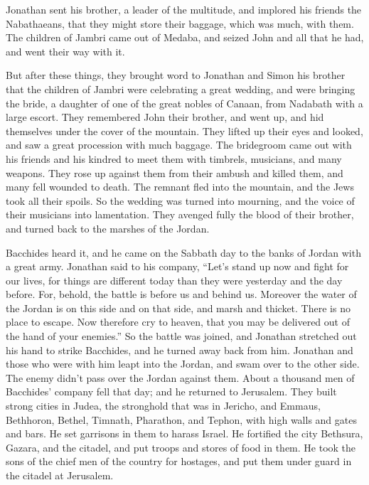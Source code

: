  Jonathan sent his brother, a leader of the multitude,
and implored his friends the Nabathaeans, that they might store their
baggage, which was much, with them.  The children of
Jambri came out of Medaba, and seized John and all that he had, and went
their way with it.

 But after these things, they brought word to Jonathan
and Simon his brother that the children of Jambri were celebrating a
great wedding, and were bringing the bride, a daughter of one of the
great nobles of Canaan, from Nadabath with a large escort.
 They remembered John their brother, and went up, and hid
themselves under the cover of the mountain.  They lifted
up their eyes and looked, and saw a great procession with much baggage.
The bridegroom came out with his friends and his kindred to meet them
with timbrels, musicians, and many weapons.  They rose up
against them from their ambush and killed them, and many fell wounded to
death. The remnant fled into the mountain, and the Jews took all their
spoils.  So the wedding was turned into mourning, and the
voice of their musicians into lamentation.  They avenged
fully the blood of their brother, and turned back to the marshes of the
Jordan.

 Bacchides heard it, and he came on the Sabbath day to
the banks of Jordan with a great army.  Jonathan said to
his company, ``Let's stand up now and fight for our lives, for things
are different today than they were yesterday and the day before.
 For, behold, the battle is before us and behind us.
Moreover the water of the Jordan is on this side and on that side, and
marsh and thicket. There is no place to escape.  Now
therefore cry to heaven, that you may be delivered out of the hand of
your enemies.''  So the battle was joined, and Jonathan
stretched out his hand to strike Bacchides, and he turned away back from
him.  Jonathan and those who were with him leapt into the
Jordan, and swam over to the other side. The enemy didn't pass over the
Jordan against them.  About a thousand men of Bacchides'
company fell that day;  and he returned to Jerusalem.
They built strong cities in Judea, the stronghold that was in Jericho,
and Emmaus, Bethhoron, Bethel, Timnath, Pharathon, and Tephon, with high
walls and gates and bars.  He set garrisons in them to
harass Israel.  He fortified the city Bethsura, Gazara,
and the citadel, and put troops and stores of food in them.
 He took the sons of the chief men of the country for
hostages, and put them under guard in the citadel at Jerusalem.

